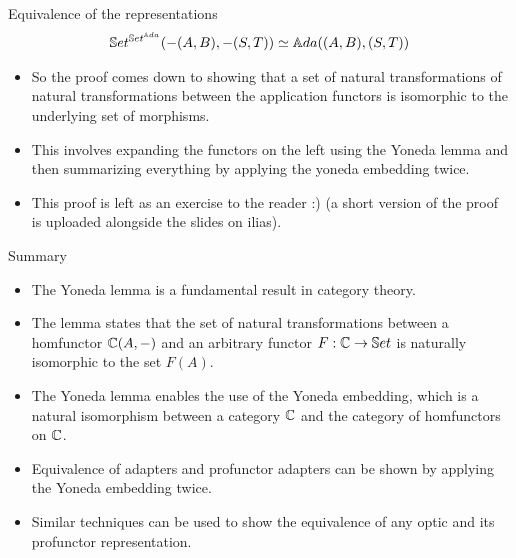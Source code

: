 \fi
\begin{frame}{Equivalence of the representations}
	\begin{align*}
		\mathbb{S}et^{\mathbb{S}et^{\mathbb{A}da}}(-(A, B), -(S, T)) \simeq {\mathbb{A}da}((A,B), (S,T))
	\end{align*}
	\begin{itemize}
		\pause\item So the proof comes down to showing that a set of natural transformations of natural transformations between the application functors is isomorphic to the underlying set of morphisms.
		\pause\item This involves expanding the functors on the left using the Yoneda lemma and then summarizing everything by applying the yoneda embedding twice.
		\pause\item This proof is left as an exercise to the reader :) \pause(a short version of the proof is uploaded alongside the slides on ilias).
	\end{itemize}
\end{frame}
\begin{frame}{Summary}
	\begin{itemize}
		\item The Yoneda lemma is a fundamental result in category theory.
		\pause\item The lemma states that the set of natural transformations between a homfunctor $\mathbb{C}(A, -)$ and an arbitrary functor $F : \mathbb{C} \to \mathbb{S}et$ is naturally isomorphic to the set $F(A)$.
		\pause\item The Yoneda lemma enables the use of the Yoneda embedding, which is a natural isomorphism between a category $\mathbb{C}$ and the category of homfunctors on $\mathbb{C}$.
		\pause\item Equivalence of adapters and profunctor adapters can be shown by applying the Yoneda embedding twice.
		\pause\item Similar techniques can be used to show the equivalence of any optic and its profunctor representation.
	\end{itemize}
\end{frame}